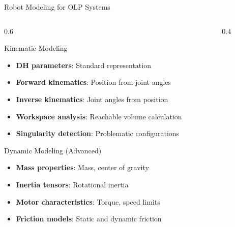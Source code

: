 \documentclass[10pt,aspectratio=169]{beamer}
\begin{document}
\begin{frame}{Robot Modeling for OLP Systems}
\begin{columns}[T]
\begin{column}{0.6\textwidth}
\begin{block}{Kinematic Modeling}
\begin{itemize}
\item \textbf{DH parameters}: Standard representation
\item \textbf{Forward kinematics}: Position from joint angles
\item \textbf{Inverse kinematics}: Joint angles from position
\item \textbf{Workspace analysis}: Reachable volume calculation
\item \textbf{Singularity detection}: Problematic configurations
\end{itemize}
\end{block}
\begin{alertblock}{Dynamic Modeling (Advanced)}
\begin{itemize}
\item \textbf{Mass properties}: Mass, center of gravity
\item \textbf{Inertia tensors}: Rotational inertia
\item \textbf{Motor characteristics}: Torque, speed limits
\item \textbf{Friction models}: Static and dynamic friction
\end{itemize}
\end{alertblock}
\end{column}
\begin{column}{0.4\textwidth}
\begin{center}
\end{center}
\end{column}
\end{columns}


\end{frame}
\end{document}
